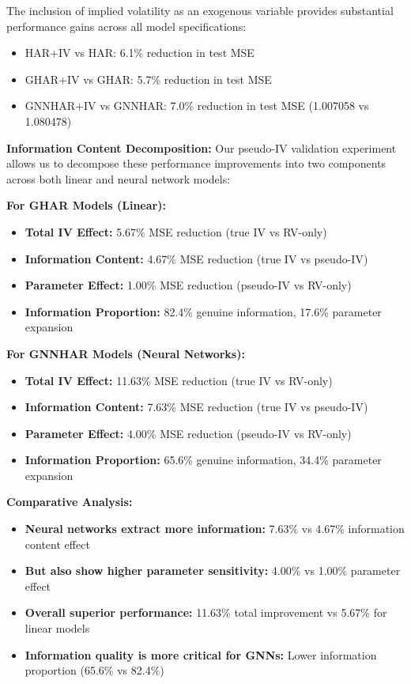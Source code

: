 \documentclass[12pt,a4paper]{article}
\begin{document}
The inclusion of implied volatility as an exogenous variable provides substantial performance gains across all model specifications:

\begin{itemize}
\item HAR+IV vs HAR: 6.1\% reduction in test MSE
\item GHAR+IV vs GHAR: 5.7\% reduction in test MSE  
\item GNNHAR+IV vs GNNHAR: 7.0\% reduction in test MSE (1.007058 vs 1.080478)
\end{itemize}

\textbf{Information Content Decomposition:} Our pseudo-IV validation experiment allows us to decompose these performance improvements into two components across both linear and neural network models:

\textbf{For GHAR Models (Linear):}
\begin{itemize}
\item \textbf{Total IV Effect:} 5.67\% MSE reduction (true IV vs RV-only)
\item \textbf{Information Content:} 4.67\% MSE reduction (true IV vs pseudo-IV)  
\item \textbf{Parameter Effect:} 1.00\% MSE reduction (pseudo-IV vs RV-only)
\item \textbf{Information Proportion:} 82.4\% genuine information, 17.6\% parameter expansion
\end{itemize}

\textbf{For GNNHAR Models (Neural Networks):}
\begin{itemize}
\item \textbf{Total IV Effect:} 11.63\% MSE reduction (true IV vs RV-only)
\item \textbf{Information Content:} 7.63\% MSE reduction (true IV vs pseudo-IV)
\item \textbf{Parameter Effect:} 4.00\% MSE reduction (pseudo-IV vs RV-only)
\item \textbf{Information Proportion:} 65.6\% genuine information, 34.4\% parameter expansion
\end{itemize}

\textbf{Comparative Analysis:}
\begin{itemize}
\item \textbf{Neural networks extract more information:} 7.63\% vs 4.67\% information content effect
\item \textbf{But also show higher parameter sensitivity:} 4.00\% vs 1.00\% parameter effect
\item \textbf{Overall superior performance:} 11.63\% total improvement vs 5.67\% for linear models
\item \textbf{Information quality is more critical for GNNs:} Lower information proportion (65.6\% vs 82.4\%)
\end{itemize}
\end{document}
